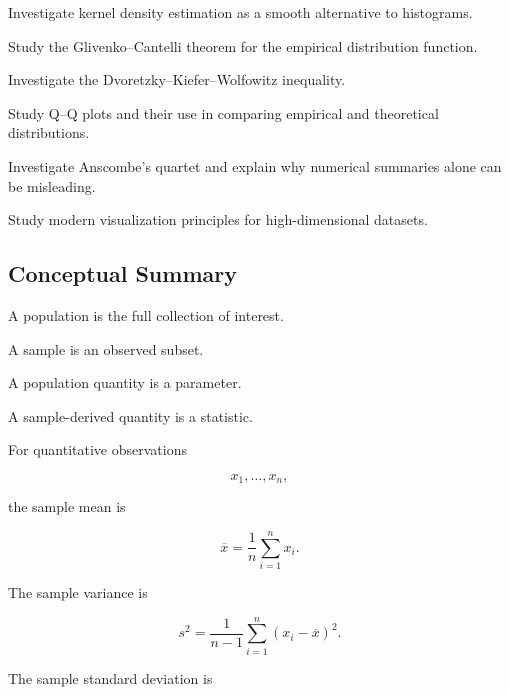 \begin{exercise}[4]
Investigate kernel density estimation as a smooth alternative to
histograms.
\end{exercise}

\begin{exercise}[4]
Study the Glivenko--Cantelli theorem for the empirical distribution
function.
\end{exercise}

\begin{exercise}[4]
Investigate the Dvoretzky--Kiefer--Wolfowitz inequality.
\end{exercise}

\begin{exercise}[4]
Study Q--Q plots and their use in comparing empirical and theoretical
distributions.
\end{exercise}

\begin{exercise}[4]
Investigate Anscombe's quartet and explain why numerical summaries alone
can be misleading.
\end{exercise}

\begin{exercise}[4]
Study modern visualization principles for high-dimensional datasets.
\end{exercise}

\subsection{Conceptual Summary}
\label{subsec:descriptive-statistics-summary}

A population is the full collection of interest.

A sample is an observed subset.

A population quantity is a parameter.

A sample-derived quantity is a statistic.

For quantitative observations

\[
x_1,\ldots,x_n,
\]

the sample mean is

\[
\boxed{
\overline{x}
=
\frac1n
\sum_{i=1}^{n}x_i.
}
\]

The sample variance is

\[
\boxed{
s^2
=
\frac1{n-1}
\sum_{i=1}^{n}
(x_i-\overline{x})^2.
}
\]

The sample standard deviation is

